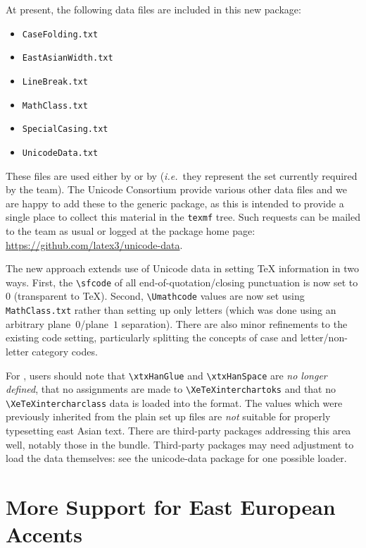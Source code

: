 \documentclass{ltnews}
\begin{document}
At present, the following data files are included in this new package:
\begin{itemize}
  \item \verb|CaseFolding.txt|
  \item \verb|EastAsianWidth.txt|
  \item \verb|LineBreak.txt|
  \item \verb|MathClass.txt|
  \item \verb|SpecialCasing.txt|
  \item \verb|UnicodeData.txt|
\end{itemize}
These files are used either by \LaTeXe{} or by 
(\emph{i.e.}~they represent the set currently required by the team). The
Unicode Consortium provide various other data files and we are happy to add
these to the generic package, as this is intended to provide a single place
to collect this material in the \verb|texmf| tree. Such requests can be
mailed to the team as usual or logged at the package home page:
\url{https://github.com/latex3/unicode-data}.

The new approach extends use of Unicode data in setting \TeX{} information in
two ways. First, the \verb|\sfcode| of all end-of-quotation/closing punctuation
is now set to $0$ (transparent to \TeX{}). Second, \verb|\Umathcode| values are
now set using \verb|MathClass.txt| rather than setting up only letters (which
was done using an arbitrary plane~$0$/plane~$1$ separation). There are also
minor refinements to the existing code setting, particularly splitting the
concepts of case and letter/non-letter category codes.

For , users should note that \verb|\xtxHanGlue| and
\verb|\xtxHanSpace| are \emph{no longer defined}, that no assignments are made
to \verb|\XeTeXinterchartoks| and that no \verb|\XeTeXintercharclass| data is
loaded into the format. The values which were previously inherited from
the plain  set up files are \emph{not} suitable for properly
typesetting east Asian text. There are third-party packages addressing this
area well, notably those in the  bundle. Third-party packages
may need adjustment to load the data themselves: see the \textsf{unicode-data}
package for one possible loader.

\section{More Support for East European Accents}
\end{document}
